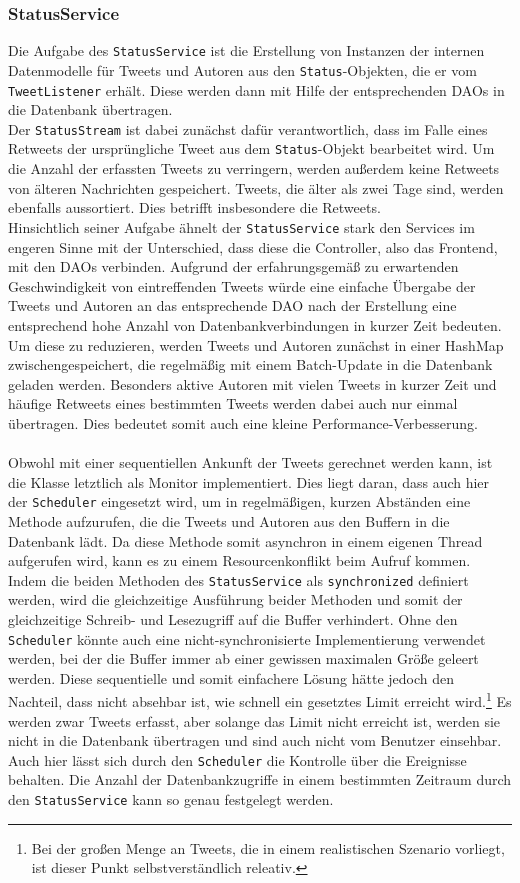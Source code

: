 \subsubsection*{StatusService}
Die Aufgabe des \texttt{StatusService} ist die Erstellung von Instanzen der internen Datenmodelle für Tweets und Autoren aus den \texttt{Status}-Objekten, die er vom \texttt{TweetListener} erhält. Diese werden dann mit Hilfe der entsprechenden DAOs in die Datenbank übertragen. \\
Der \texttt{StatusStream} ist dabei zunächst dafür verantwortlich, dass im Falle eines Retweets der ursprüngliche Tweet aus dem \texttt{Status}-Objekt bearbeitet wird. Um die Anzahl der erfassten Tweets zu verringern, werden außerdem keine Retweets von älteren Nachrichten gespeichert. Tweets, die älter als zwei Tage sind, werden ebenfalls aussortiert. Dies betrifft insbesondere die Retweets. \\
Hinsichtlich seiner Aufgabe ähnelt der \texttt{StatusService} stark den Services im engeren Sinne mit der Unterschied, dass diese die Controller, also das Frontend, mit den DAOs verbinden. Aufgrund der erfahrungsgemäß zu erwartenden Geschwindigkeit von eintreffenden Tweets würde eine einfache Übergabe der Tweets und Autoren an das entsprechende DAO nach der Erstellung eine entsprechend hohe Anzahl von Datenbankverbindungen in kurzer Zeit bedeuten. Um diese zu reduzieren, werden Tweets und Autoren zunächst in einer HashMap zwischengespeichert, die regelmäßig mit einem Batch-Update in die Datenbank geladen werden. Besonders aktive Autoren mit vielen Tweets in kurzer Zeit und häufige Retweets eines bestimmten Tweets werden dabei auch nur einmal übertragen. Dies bedeutet somit auch eine kleine Performance-Verbesserung.
\\\\
Obwohl mit einer sequentiellen Ankunft der Tweets gerechnet werden kann, ist die Klasse letztlich als Monitor implementiert. Dies liegt daran, dass auch hier der \texttt{Scheduler} eingesetzt wird, um in regelmäßigen, kurzen Abständen eine Methode aufzurufen, die die Tweets und Autoren aus den Buffern in die Datenbank lädt. Da diese Methode somit asynchron in einem eigenen Thread aufgerufen wird, kann es zu einem Resourcenkonflikt beim Aufruf kommen. Indem die beiden Methoden des \texttt{StatusService} als \texttt{synchronized} definiert werden, wird die gleichzeitige Ausführung beider Methoden und somit der gleichzeitige Schreib- und Lesezugriff auf die Buffer verhindert. Ohne den \texttt{Scheduler} könnte auch eine nicht-synchronisierte Implementierung verwendet werden, bei der die Buffer immer ab einer gewissen maximalen Größe geleert werden. Diese sequentielle und somit einfachere Lösung hätte jedoch den Nachteil, dass nicht absehbar ist, wie schnell ein gesetztes Limit erreicht wird.\footnote{Bei der großen Menge an Tweets, die in einem realistischen Szenario vorliegt, ist dieser Punkt selbstverständlich releativ.} Es werden zwar Tweets erfasst, aber solange das Limit nicht erreicht ist, werden sie nicht in die Datenbank übertragen und sind auch nicht vom Benutzer einsehbar. Auch hier lässt sich durch den \texttt{Scheduler} die Kontrolle über die Ereignisse behalten. Die Anzahl der Datenbankzugriffe in einem bestimmten Zeitraum durch den \texttt{StatusService} kann so genau festgelegt werden.
%
